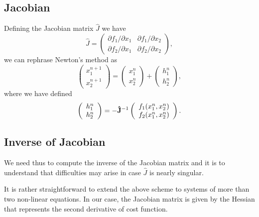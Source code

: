 \documentclass[%
oneside,                 %
final,                   %
10pt]{article}
\begin{document}
\subsection{Jacobian}
Defining the Jacobian matrix $\hat{J}$ we have
\[
 \hat{J}=\left( \begin{array}{cc}
                         \partial f_1/\partial x_1  & \partial f_1/\partial x_2 \\
                          \partial f_2/\partial x_1     &\partial f_2/\partial x_2
             \end{array} \right),
\]
we can rephrase Newton's method as
\[
\left(\begin{array}{c} x_1^{n+1} \\ x_2^{n+1} \end{array} \right)=
\left(\begin{array}{c} x_1^{n} \\ x_2^{n} \end{array} \right)+
\left(\begin{array}{c} h_1^{n} \\ h_2^{n} \end{array} \right),
\]
where we have defined
\[
   \left(\begin{array}{c} h_1^{n} \\ h_2^{n} \end{array} \right)=
   -{\bf \hat{J}}^{-1}
   \left(\begin{array}{c} f_1(x_1^{n},x_2^{n}) \\ f_2(x_1^{n},x_2^{n}) \end{array} \right).
\]

\subsection{Inverse of Jacobian}

We need thus to compute the inverse of the Jacobian matrix and it
is to understand that difficulties  may
arise in case $\hat{J}$ is nearly singular.

It is rather straightforward to extend the above scheme to systems of
more than two non-linear equations. In our case, the Jacobian matrix is given by the Hessian that represents the second derivative of cost function. 



\end{document}
